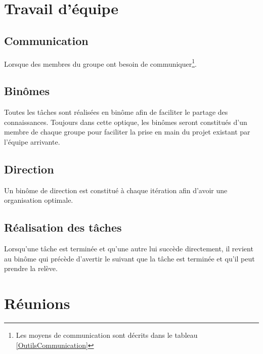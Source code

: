 \documentclass[11pt,fleqn]{report}
\begin{document}
\section{Travail d'équipe}

\subsection{Communication}
Lorsque des membres du groupe ont besoin de communiquer\footnote{Les moyens de communication sont décrits dans le tableau \ref{OutilsCommunication}}.

\subsection{Binômes}
Toutes les tâches sont réalisées en binôme afin de faciliter le partage des connaissances.
Toujours dans cette optique, les binômes seront constitués d'un membre de chaque groupe pour faciliter la prise en main du projet existant par l'équipe arrivante.

\subsection{Direction}
Un binôme de direction est constitué à chaque itération afin d'avoir une organisation optimale.

\subsection{Réalisation des tâches}
Lorsqu'une tâche est terminée et qu'une autre lui succède directement, il revient au binôme qui précède d'avertir le suivant que la tâche est terminée et qu'il peut prendre la relève.

\section{Réunions}
\end{document}
